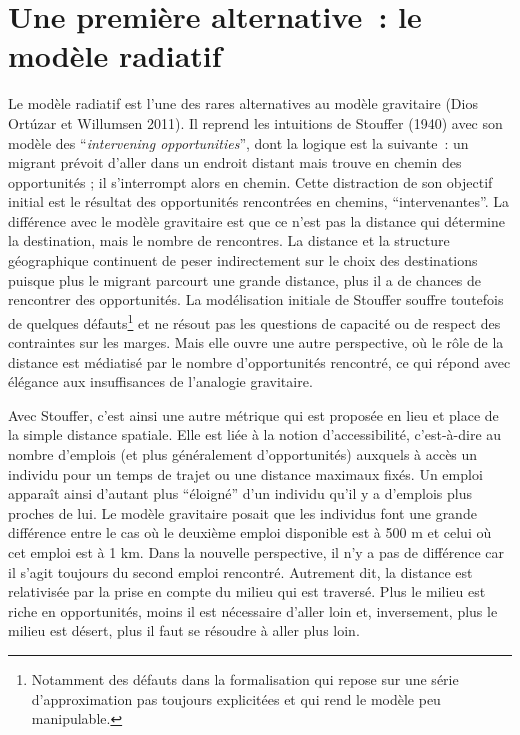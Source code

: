 \documentclass[
  10pt,
  a4paper,
  numbers=noendperiod,
  DIV=9]{scrreprt}
\begin{document}
\hypertarget{sec-rad}{%
\section{Une première alternative~: le modèle radiatif}\label{sec-rad}}

Le modèle radiatif est l'une des rares alternatives au modèle gravitaire
(Dios Ortúzar et Willumsen 2011). Il reprend les intuitions de Stouffer
(1940) avec son modèle des ``\emph{intervening opportunities}'', dont la
logique est la suivante~: un migrant prévoit d'aller dans un endroit
distant mais trouve en chemin des opportunités ; il s'interrompt alors
en chemin. Cette distraction de son objectif initial est le résultat des
opportunités rencontrées en chemins, ``intervenantes''. La différence
avec le modèle gravitaire est que ce n'est pas la distance qui détermine
la destination, mais le nombre de rencontres. La distance et la
structure géographique continuent de peser indirectement sur le choix
des destinations puisque plus le migrant parcourt une grande distance,
plus il a de chances de rencontrer des opportunités. La modélisation
initiale de Stouffer souffre toutefois de quelques défauts\footnote{Notamment
  des défauts dans la formalisation qui repose sur une série
  d'approximation pas toujours explicitées et qui rend le modèle peu
  manipulable.} et ne résout pas les questions de capacité ou de respect
des contraintes sur les marges. Mais elle ouvre une autre perspective,
où le rôle de la distance est médiatisé par le nombre d'opportunités
rencontré, ce qui répond avec élégance aux insuffisances de l'analogie
gravitaire.

Avec Stouffer, c'est ainsi une autre métrique qui est proposée en lieu
et place de la simple distance spatiale. Elle est liée à la notion
d'accessibilité, c'est-à-dire au nombre d'emplois (et plus généralement
d'opportunités) auxquels à accès un individu pour un temps de trajet ou
une distance maximaux fixés. Un emploi apparaît ainsi d'autant plus
``éloigné'' d'un individu qu'il y a d'emplois plus proches de lui. Le
modèle gravitaire posait que les individus font une grande différence
entre le cas où le deuxième emploi disponible est à 500 m et celui où
cet emploi est à 1 km. Dans la nouvelle perspective, il n'y a pas de
différence car il s'agit toujours du second emploi rencontré. Autrement
dit, la distance est relativisée par la prise en compte du milieu qui
est traversé. Plus le milieu est riche en opportunités, moins il est
nécessaire d'aller loin et, inversement, plus le milieu est désert, plus
il faut se résoudre à aller plus loin.
\end{document}
